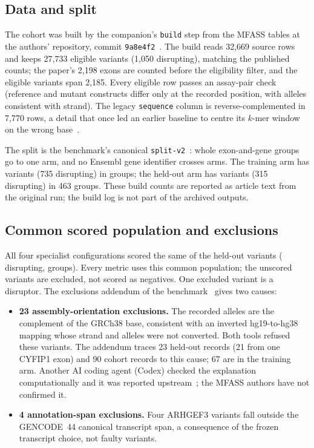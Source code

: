 \documentclass[11pt]{article}
\begin{document}
\subsection{Data and split}\label{sec:data}
The cohort was built by the companion's \texttt{build} step from the MFASS tables at the authors' repository,
commit \texttt{9a8e4f2}~\citep{kosurilab_mfass}. The build reads 32,669 source rows and keeps 27,733 eligible
variants (1,050 disrupting), matching the published counts; the paper's 2,198 exons are counted before the
eligibility filter, and the eligible variants span 2,185. Every eligible row passes an assay-pair check
(reference and mutant constructs differ only at the recorded position, with alleles consistent with strand).
The legacy \texttt{sequence} column is reverse-complemented in 7,770 rows, a detail that once led an earlier
baseline to centre its $k$-mer window on the wrong base~\citep{rb_mfass_readme}.

The split is the benchmark's canonical \texttt{split-v2}~\citep{rb_mfass_readme}: whole exon-and-gene groups
go to one arm, and no Ensembl gene identifier crosses arms. The training arm has \TrainVariants{} variants
(735 disrupting) in \TrainGroups{} groups; the held-out arm has \HeldOut{} variants (315 disrupting) in 463
groups. These build counts are reported as article text from the original run; the build log is not part of
the archived outputs.

\subsection{Common scored population and exclusions}\label{sec:population}
All four specialist configurations scored the same \Common{} of the \HeldOut{} held-out variants
(\Positives{} disrupting, \Groups{} groups). Every metric uses this common population; the \Excluded{}
unscored variants are excluded, not scored as negatives. One excluded variant is a disruptor. The
exclusions addendum of the benchmark~\citep{rb_exclusions} gives two causes:
\begin{itemize}
\item \textbf{23 assembly-orientation exclusions.} The recorded alleles are the complement of the GRCh38 base,
consistent with an inverted hg19-to-hg38 mapping whose strand and alleles were not converted. Both tools
refused these variants. The addendum traces 23 held-out records (21 from one CYFIP1 exon) and 90 cohort
records to this cause; 67 are in the training arm. Another AI coding agent (Codex) checked the explanation
computationally and it was reported upstream~\citep{mfass_issue1}; the MFASS authors have not confirmed it.
\item \textbf{4 annotation-span exclusions.} Four ARHGEF3 variants fall outside the GENCODE~44 canonical
transcript span, a consequence of the frozen transcript choice, not faulty variants.
\end{itemize}
\end{document}
